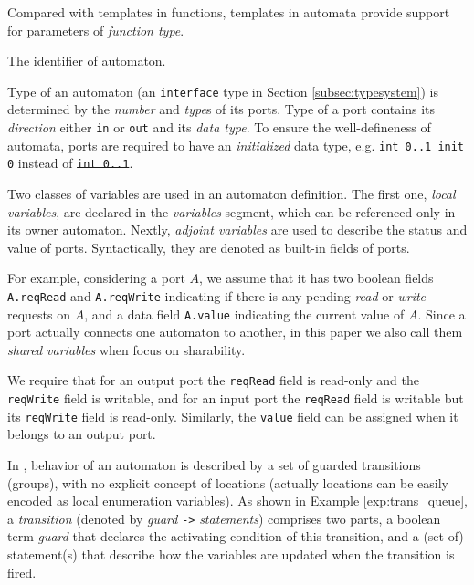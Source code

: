  Compared with templates in functions, templates in automata provide support for parameters of \emph{function type}.

 The identifier of automaton.

 Type of an automaton (an \texttt{interface} type in Section \ref{subsec:typesystem}) is determined by the \emph{number} and \emph{type}s of its ports. Type of a port contains its \emph{direction} either \texttt{in} or \texttt{out} and its \emph{data type}. To ensure the well-defineness of automata, ports are required to have an \emph{initialized} data type, e.g. \texttt{int 0..1 init 0} instead of \sout{\texttt{int 0..1}}.

 Two classes of variables are used in an automaton definition. The first one, \emph{local variables}, are declared in the \emph{variables} segment, which can be referenced only in its owner automaton. Nextly, \emph{adjoint variables} are used to describe the status and value of ports. Syntactically, they are denoted as built-in fields of ports.

For example, considering a port $A$, we assume that it has two boolean fields \texttt{A.reqRead} and \texttt{A.reqWrite} indicating if there is any pending \emph{read} or \emph{write} requests on $A$, and a data field \texttt{A.value} indicating the current value of $A$. Since a port actually connects one automaton to another, in this paper we also call them \emph{shared variables} when focus on sharability.

We require that for an output port the \texttt{reqRead} field is read-only and the \texttt{reqWrite} field is writable, and for an input port the \texttt{reqRead} field is writable but its \texttt{reqWrite} field is read-only. Similarly, the \texttt{value} field can be assigned when it belongs to an output port.

In \lang{}, behavior of an automaton is described by a set of guarded transitions (groups), with no explicit concept of locations (actually locations can be easily encoded as local enumeration variables). As shown in  Example \ref{exp:trans_queue}, a \emph{transition} (denoted by \emph{guard} \texttt{->} \emph{statements}) comprises two parts, a boolean term \emph{guard} that declares the activating condition of this transition, and a (set of) statement(s) that describe how the variables are updated when the transition is fired.

